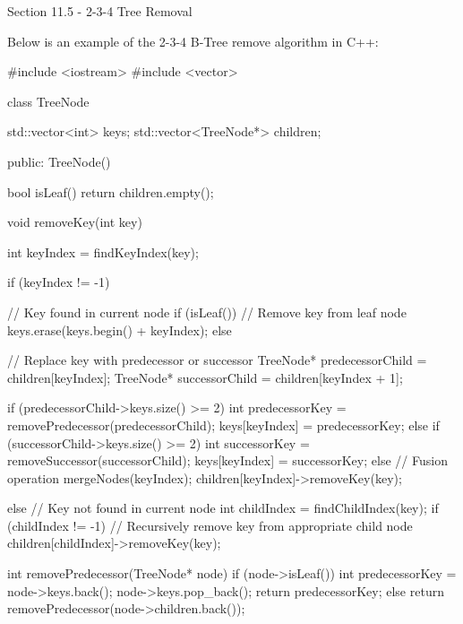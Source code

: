 \begin{notes}{Section 11.5 - 2-3-4 Tree Removal}
    \begin{highlight}
        Below is an example of the 2-3-4 B-Tree remove algorithm in C++:
    
        \begin{code}[C++]
        #include <iostream>
        #include <vector>
        
        class TreeNode {
            std::vector<int> keys;
            std::vector<TreeNode*> children;
        
        public:
            TreeNode() {}
        
            bool isLeaf() {
                return children.empty();
            }
        
            void removeKey(int key) {
                int keyIndex = findKeyIndex(key);
        
                if (keyIndex != -1) {
                    // Key found in current node
                    if (isLeaf()) {
                        // Remove key from leaf node
                        keys.erase(keys.begin() + keyIndex);
                    } else {
                        // Replace key with predecessor or successor
                        TreeNode* predecessorChild = children[keyIndex];
                        TreeNode* successorChild = children[keyIndex + 1];
        
                        if (predecessorChild->keys.size() >= 2) {
                            int predecessorKey = removePredecessor(predecessorChild);
                            keys[keyIndex] = predecessorKey;
                        } else if (successorChild->keys.size() >= 2) {
                            int successorKey = removeSuccessor(successorChild);
                            keys[keyIndex] = successorKey;
                        } else {
                            // Fusion operation
                            mergeNodes(keyIndex);
                            children[keyIndex]->removeKey(key);
                        }
                    }
                } else {
                    // Key not found in current node
                    int childIndex = findChildIndex(key);
                    if (childIndex != -1) {
                        // Recursively remove key from appropriate child node
                        children[childIndex]->removeKey(key);
                    }
                }
            }
        
            int removePredecessor(TreeNode* node) {
                if (node->isLeaf()) {
                    int predecessorKey = node->keys.back();
                    node->keys.pop_back();
                    return predecessorKey;
                } else {
                    return removePredecessor(node->children.back());
                }
            }
        
}
\end{code}
\end{highlight}
\end{notes}
